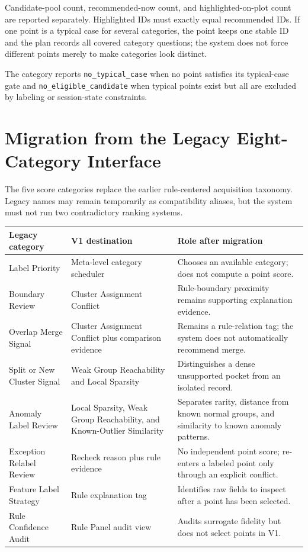 \documentclass[11pt]{article}
\begin{document}
Candidate-pool count, recommended-now count, and highlighted-on-plot count are
reported separately. Highlighted IDs must exactly equal recommended IDs. If one
point is a typical case for several categories, the point keeps one stable ID
and the plan records all covered category questions; the system does not force
different points merely to make categories look distinct.

The category reports \texttt{no\_typical\_case} when no point satisfies its
typical-case gate and \texttt{no\_eligible\_candidate} when typical points exist
but all are excluded by labeling or session-state constraints.

\section{Migration from the Legacy Eight-Category Interface}

The five score categories replace the earlier rule-centered acquisition
taxonomy. Legacy names may remain temporarily as compatibility aliases, but the
system must not run two contradictory ranking systems.

\begin{table}[h]
\centering
\small
\begin{tabularx}{\textwidth}{p{} p{} X}
\toprule
Legacy category & V1 destination & Role after migration \\
\midrule
Label Priority & Meta-level category scheduler & Chooses an available category;
does not compute a point score. \\

Boundary Review & Cluster Assignment Conflict & Rule-boundary proximity remains
supporting explanation evidence. \\

Overlap Merge Signal & Cluster Assignment Conflict plus comparison evidence &
Remains a rule-relation tag; the system does not automatically recommend merge. \\

Split or New Cluster Signal & Weak Group Reachability and Local Sparsity &
Distinguishes a dense unsupported pocket from an isolated record. \\

Anomaly Label Review & Local Sparsity, Weak Group Reachability, and
Known-Outlier Similarity & Separates rarity, distance from known normal groups,
and similarity to known anomaly patterns. \\

Exception Relabel Review & Recheck reason plus rule evidence & No independent
point score; re-enters a labeled point only through an explicit conflict. \\

Feature Label Strategy & Rule explanation tag & Identifies raw fields to inspect
after a point has been selected. \\

Rule Confidence Audit & Rule Panel audit view & Audits surrogate fidelity but
does not select points in V1. \\
\bottomrule
\end{tabularx}
\end{table}
\end{document}

